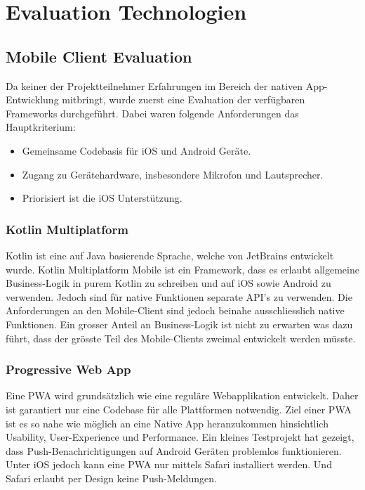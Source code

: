 \section{Evaluation Technologien}\label{sec:evaluation-technologien}

\subsection{Mobile Client Evaluation}\label{subsec:mobile-client-eval}

Da keiner der Projektteilnehmer Erfahrungen im Bereich der nativen App-Entwicklung mitbringt, wurde zuerst eine Evaluation der verfügbaren Frameworks durchgeführt.
Dabei waren folgende Anforderungen das Hauptkriterium:
\begin{itemize}
    \item Gemeinsame Codebasis für iOS und Android Geräte.
    \item Zugang zu Gerätehardware, insbesondere Mikrofon und Lautsprecher.
    \item Priorisiert ist die iOS Unterstützung.
\end{itemize}

\subsubsection{Kotlin Multiplatform}
Kotlin ist eine auf Java basierende Sprache, welche von JetBrains entwickelt wurde.
Kotlin Multiplatform Mobile ist ein Framework, dass es erlaubt allgemeine Business-Logik in purem Kotlin zu schreiben und auf iOS sowie Android zu verwenden.
Jedoch sind für native Funktionen separate API's zu verwenden. Die Anforderungen an den Mobile-Client sind jedoch beinahe ausschliesslich native Funktionen.
Ein grosser Anteil an Business-Logik ist nicht zu erwarten was dazu führt, dass der grösste Teil des Mobile-Clients zweimal entwickelt werden müsste.\cite{kotlin-platform-specific-APIs}

\subsubsection{Progressive Web App}
Eine PWA wird grundsätzlich wie eine reguläre Webapplikation entwickelt.
Daher ist garantiert nur eine Codebase für alle Plattformen notwendig.
Ziel einer PWA ist es so nahe wie möglich an eine Native App heranzukommen hinsichtlich Usability, User-Experience und Performance.\cite{what-are-PWAS}
Ein kleines Testprojekt hat gezeigt, dass Push-Benachrichtigungen auf Android Geräten problemlos funktionieren.
Unter iOS jedoch kann eine PWA nur mittels Safari installiert werden. Und Safari erlaubt per Design keine Push-Meldungen.\cite{canIUsePush,iOSSupportPush}

